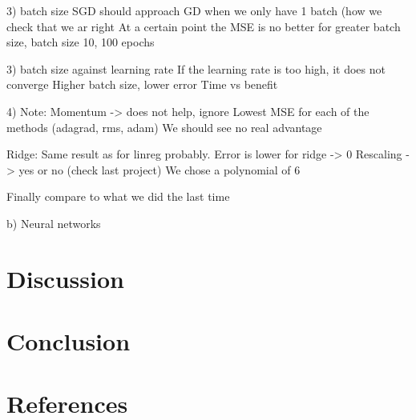 \documentclass[english,notitlepage,reprint,nofootinbib]{revtex4–2}  %
\begin{document}
3) batch size 
SGD should approach GD when we only have 1 batch (how we check that we ar right
At a certain point the MSE is no better for greater batch size, batch size 10, 100 epochs 

3) batch size against learning rate
If the learning rate is too high, it does not converge 
Higher batch size, lower error 
Time vs benefit 

4) Note: Momentum -> does not help, ignore 
Lowest MSE for each of the methods (adagrad, rms, adam) 
We should see no real advantage 

Ridge: Same result as for linreg probably. Error is lower for ridge -> 0 
Rescaling -> yes or no (check last project) 
We chose a polynomial of 6 

Finally compare to what we did the last time 

b) Neural networks 





















\section{Discussion}\label{sec:discussion}



\section{Conclusion}\label{sec:conclusion}


\newpage 
\section*{References}
\printbibliography[heading=none]


\onecolumngrid
%
\end{document}

